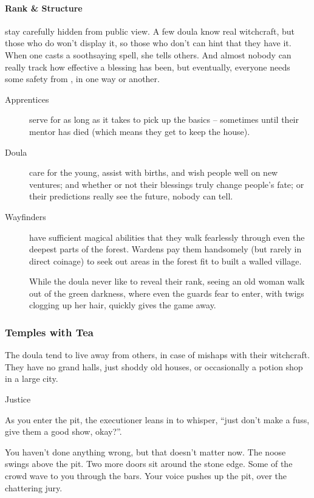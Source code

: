 \begin{multicols}{2}
  \paragraph{Rank \& Structure}
  stay carefully hidden from public view.
  A few doula know real witchcraft, but those who do won't display it, so those who don't can hint that they have it.
  When one casts a soothsaying spell, she tells others.
  And almost nobody can really track how effective a blessing has been, but eventually, everyone needs some safety from \hphantom{Nemo}, in one way or another.

  \begin{description}
    \item[Apprentices]
    serve for as long as it takes to pick up the basics -- sometimes until their mentor has died (which means they get to keep the house).
    \item[Doula]
    care for the young, assist with births, and wish people well on new ventures; and whether or not their blessings truly change people's fate; or their predictions really see the future, nobody can tell.
    \item[Wayfinders]
    have sufficient magical abilities that they walk fearlessly through even the deepest parts of the forest.
    Wardens pay them handsomely (but rarely in direct coinage) to seek out areas in the forest fit to built a walled village.

    While the doula never like to reveal their rank, seeing an old woman walk out of the green darkness, where even the \glspl{guard} fear to enter, with twigs clogging up her hair, quickly gives the game away.
  \end{description}

\subsubsection{Temples with Tea}
The doula tend to live away from others, in case of mishaps with their witchcraft.
They have no grand halls, just shoddy old houses, or occasionally a potion shop in a large city.

  {Justice}%
  {
    As you enter the pit, the executioner leans in to whisper, ``just don't make a fuss, give them a good show, okay?''.

    You haven't done anything wrong, but that doesn't matter now.
    The noose swings above the pit.
    Two more doors sit around the stone edge.
    Some of the crowd wave to you through the bars.
    Your voice pushes up the pit, over the chattering jury.

}
\end{multicols}
